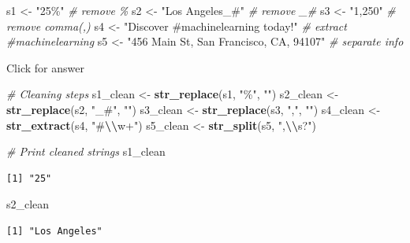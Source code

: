 \documentclass[
]{book}
\newenvironment{Shaded}{\begin{snugshade}}{\end{snugshade}}
\newcommand{\CommentTok}[1]{\textcolor[rgb]{0.56,0.35,0.01}{\textit{#1}}}
\newcommand{\FunctionTok}[1]{\textcolor[rgb]{0.13,0.29,0.53}{\textbf{#1}}}
\newcommand{\NormalTok}[1]{#1}
\newcommand{\OtherTok}[1]{\textcolor[rgb]{0.56,0.35,0.01}{#1}}
\newcommand{\SpecialCharTok}[1]{\textcolor[rgb]{0.81,0.36,0.00}{\textbf{#1}}}
\newcommand{\StringTok}[1]{\textcolor[rgb]{0.31,0.60,0.02}{#1}}
\begin{document}
\begin{Shaded}
\begin{Highlighting}[]
\NormalTok{s1 }\OtherTok{\textless{}{-}} \StringTok{"25\%"}  \CommentTok{\# remove \%}
\NormalTok{s2 }\OtherTok{\textless{}{-}} \StringTok{"Los Angeles\_\#"}  \CommentTok{\# remove \_\#}
\NormalTok{s3 }\OtherTok{\textless{}{-}} \StringTok{"1,250"}    \CommentTok{\# remove comma(,)}
\NormalTok{s4 }\OtherTok{\textless{}{-}} \StringTok{"Discover \#machinelearning today!"}   \CommentTok{\# extract \#machinelearning}
\NormalTok{s5 }\OtherTok{\textless{}{-}} \StringTok{"456 Main St, San Francisco, CA, 94107"}   \CommentTok{\# separate info}
\end{Highlighting}
\end{Shaded}

Click for answer

\begin{Shaded}
\begin{Highlighting}[]
\CommentTok{\# Cleaning steps}
\NormalTok{s1\_clean }\OtherTok{\textless{}{-}} \FunctionTok{str\_replace}\NormalTok{(s1, }\StringTok{"\%"}\NormalTok{, }\StringTok{""}\NormalTok{)}
\NormalTok{s2\_clean }\OtherTok{\textless{}{-}} \FunctionTok{str\_replace}\NormalTok{(s2, }\StringTok{"\_\#"}\NormalTok{, }\StringTok{""}\NormalTok{)}
\NormalTok{s3\_clean }\OtherTok{\textless{}{-}} \FunctionTok{str\_replace}\NormalTok{(s3, }\StringTok{","}\NormalTok{, }\StringTok{""}\NormalTok{)}
\NormalTok{s4\_clean }\OtherTok{\textless{}{-}} \FunctionTok{str\_extract}\NormalTok{(s4, }\StringTok{"\#}\SpecialCharTok{\textbackslash{}\textbackslash{}}\StringTok{w+"}\NormalTok{)}
\NormalTok{s5\_clean }\OtherTok{\textless{}{-}} \FunctionTok{str\_split}\NormalTok{(s5, }\StringTok{",}\SpecialCharTok{\textbackslash{}\textbackslash{}}\StringTok{s?"}\NormalTok{)}

\CommentTok{\# Print cleaned strings}
\NormalTok{s1\_clean}
\end{Highlighting}
\end{Shaded}

\begin{verbatim}
[1] "25"
\end{verbatim}

\begin{Shaded}
\begin{Highlighting}[]
\NormalTok{s2\_clean}
\end{Highlighting}
\end{Shaded}

\begin{verbatim}
[1] "Los Angeles"
\end{verbatim}
\end{document}
